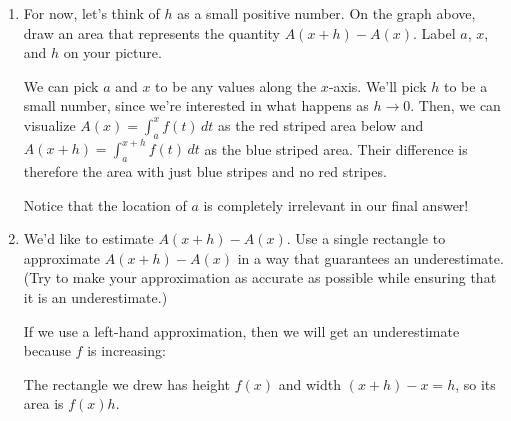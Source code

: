 \documentclass[main]{subfiles}
\begin{document}
\begin{enumerate}[resume]
{    \begin{enumerate}[resume]
    \item
      \begin{problem}
        For now, let's think of $h$ as a small positive number. 
        On the graph above, draw an
        area that represents the quantity $A(x + h) - A(x)$.
        Label $a$, $x$, and $h$ on your picture.
      \end{problem}

      \begin{solution}
        We can pick $a$ and $x$ to be any values along the $x$-axis.  We'll
        pick $h$ to be a small number, since we're interested in what happens
        as $h \to 0$.  Then, we can visualize $A(x) = \displaystyle
        \int_a^x f(t)\,dt$ as the red striped area below and $A(x + h)
        = \displaystyle \int_a^{x + h} 
        f(t)\,dt$ as the blue striped area.  Their difference is therefore
        the area with just blue stripes and no red stripes.
        \begin{center}
        \end{center}
        Notice that the location of $a$ is completely irrelevant in our
        final answer!
      \end{solution}

    \item
      \begin{problem}[\vfill]
        We'd like to estimate $A(x + h) - A(x)$.  Use a single
        rectangle to approximate $A(x + h) - A(x)$ in a way that
        guarantees an underestimate.  (Try to make your approximation as
        accurate as possible while ensuring that it is an underestimate.)
      \end{problem}

      \begin{solution}
        If we use a left-hand approximation, then we will get an underestimate
        because $f$ is increasing:
        \begin{center}
        \end{center}
        The rectangle we drew has height $f(x)$ and width $(x + h) - x =
        h$, so its area is $f(x) h$.
      \end{solution}


\end{enumerate}}
\end{enumerate}
\end{document}
